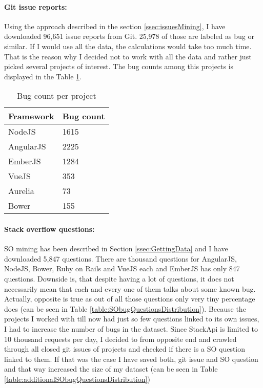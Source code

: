 \paragraph{Git issue reports:}
Using the approach described in the section \ref{ssec:issuesMining}, I have downloaded 96,651 issue reports from Git. 25,978 of those are labeled as bug or similar. If I would use all the data, the calculations would take too much time. That is the reason why I decided not to work with all the data and rather just picked several projects of interest. The bug counts among this projects is displayed in the Table \ref{table:gitProjectIssuesDistribution}.


\begin{table}[H]
\centering
\begin{tabular}{ |p{3cm}||p{3cm}|}
 \hline
\textbf{ Framework }& \textbf{Bug count}\\
 \hline
 NodeJS   & 1615\\ \hline
 AngularJS &   2225 \\ \hline
 EmberJS & 1284\\ \hline
 VueJS & 353\\ \hline
 Aurelia & 73\\ \hline
 Bower & 155\\ \hline
\end{tabular}
\caption{Bug count per project}
\label{table:gitProjectIssuesDistribution}
\end{table}

\paragraph{Stack overflow questions:}
SO mining has been described in Section \ref{ssec:GettingData} and I have downloaded 5,847 questions. There are thousand questions for AngularJS, NodeJS, Bower, Ruby on Rails and VueJS each and EmberJS has only 847 questions. Downside is, that despite having a lot of questions, it does not necessarily mean that each and every one of them talks about some known bug. Actually, opposite is true as out of all those questions only very tiny percentage does (can be seen in Table \ref{table:SObugQuestionsDistribution}). Because the projects I worked with till now had just so few questions linked to its own issues, I had to increase the number of bugs in the dataset. Since StackApi is limited to 10 thousand requests per day, I decided to from opposite end and crawled through all closed git issues of projects and checked if there is a SO question linked to them. If that was the case I have saved both, git issue and SO question and that way increased the size of my dataset (can be seen in Table \ref{table:additionalSObugQuestionsDistribution})

